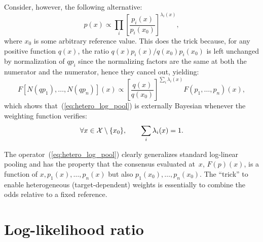 \documentclass[english]{scrartcl}
\begin{document}
Consider, however, the following alternative:
\begin{equation}
\label{eq:hetero_log_pool}
p(x) \propto \prod_i \left[\frac{p_i(x)}{p_i(x_0)}\right]^{\lambda_i(x)},    
\end{equation}
where $x_0$ is some arbitrary reference value. This does the trick because, for any positive function $q(x)$, the ratio $q(x)p_i(x)/q(x_0)p_i(x_0)$ is left unchanged by normalization of $q p_i$ since the normalizing factors are the same at both the numerator and the numerator, hence they cancel out, yielding:
$$
F[N(q p_1), \ldots, N(q p_n)](x)
\propto
\left[\frac{q(x)}{q(x_0)}\right]^{\sum_i \lambda_i(x)}
F(p_1, \ldots, p_n)(x),
$$
which shows that~(\ref{eq:hetero_log_pool}) is externally Bayesian whenever the weighting function verifies:
$$
\forall x \in {\cal X}\setminus \{x_0\},
\qquad
\sum_i \lambda_i(x) = 1.
$$

The operator~(\ref{eq:hetero_log_pool}) clearly generalizes standard log-linear pooling and has the property that the consensus evaluated at~$x$, $F(p)(x)$, is a function of $x,p_1(x),\ldots,p_n(x)$ but also $p_1(x_0),\ldots,p_n(x_0)$. The ``trick'' to enable heterogeneous (target-dependent) weights is essentially to combine the odds relative to a fixed reference.

 



\section{Log-likelihood ratio}
\end{document}
